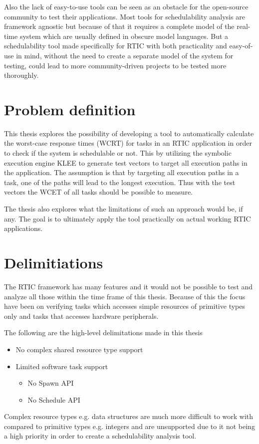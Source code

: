 Also the lack of easy-to-use tools can be seen as an obstacle for the
open-source community to test their applications. Most tools for schedulability
analysis are framework agnostic but because of that it requires a complete
model of the real-time system which are usually defined in obscure model
languages. But a schedulability tool made specifically for RTIC with both
practicality and easy-of-use in mind, without the need to create a separate
model of the system for testing, could lead to more community-driven projects
to be tested more thoroughly.

\section{Problem definition}
This thesis explores the possibility of developing a tool to automatically
calculate the worst-case response times (WCRT) for tasks in an RTIC application
in order to check if the system is schedulable or not. This by utilizing the
symbolic execution engine KLEE to generate test vectors to target all execution
paths in the application. The assumption is that by targeting all execution
paths in a task, one of the paths will lead to the longest execution. Thus
with the test vectors the WCET of all tasks should be possible to measure.

The thesis also explores what the limitations of such an approach would be, if
any. The goal is to ultimately apply the tool practically on actual working
RTIC applications.

\section{Delimitiations}
The RTIC framework has many features and it would not be possible to test and
analyze all those within the time frame of this thesis. Because of this the
focus have been on verifying tasks which accesses simple resources of primitive
types only and tasks that accesses hardware peripherals.

The following are the high-level delimitations made in this thesis
\begin{itemize}
    \item No complex shared resource type support
    \item Limited software task support
    \begin{itemize}
        \item No Spawn API
        \item No Schedule API
    \end{itemize}
\end{itemize}
Complex resource types e.g. data structures are much more difficult to work
with compared to primitive types e.g. integers and are unsupported due to it
not being a high priority in order to create a schedulability analysis tool.


